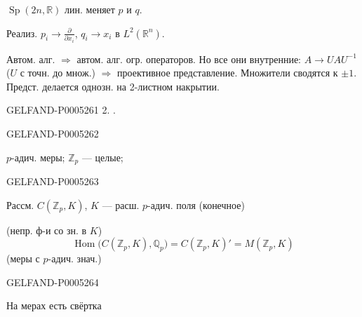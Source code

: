 $\operatorname{Sp}(2n,\mathbb R)$ лин. меняет $p$ и $q$.

Реализ.
$p_i\longrightarrow\frac{\partial}{\partial x_i}$,
$q_i\longrightarrow x_i$ в $L^2(\mathbb R^n)$.

Автом. алг. $\Longrightarrow$ автом. алг. огр. операторов.
Но все они внутренние: $A\longrightarrow UAU^{-1}$
($U$ с точн. до множ.) $\Rightarrow$ проективное представление.
Множители сводятся к $\pm1$.
Предст. делается однозн. на 2-листном накрытии.


\begin{GelfandAdjacentEvidence}{GELFAND-P000526}{1}
2. .
\end{GelfandAdjacentEvidence}
\begin{GelfandAdjacentEvidence}{GELFAND-P000526}{2}


$p$-адич. меры; $\mathbb Z_p$ — целые;
\end{GelfandAdjacentEvidence}
\begin{GelfandAdjacentEvidence}{GELFAND-P000526}{3}


Рассм. $C(\mathbb Z_p,K)$, $K$ — расш. $p$-адич. поля (конечное)

(непр. ф-и со зн. в $K$)
\[
\operatorname{Hom}\bigl(C(\mathbb Z_p,K),\mathbb Q_p\bigr)
=C(\mathbb Z_p,K)'=M(\mathbb Z_p,K)
\]
(меры с $p$-адич. знач.)
\end{GelfandAdjacentEvidence}
\begin{GelfandAdjacentEvidence}{GELFAND-P000526}{4}


На мерах есть свёртка
\end{GelfandAdjacentEvidence}
